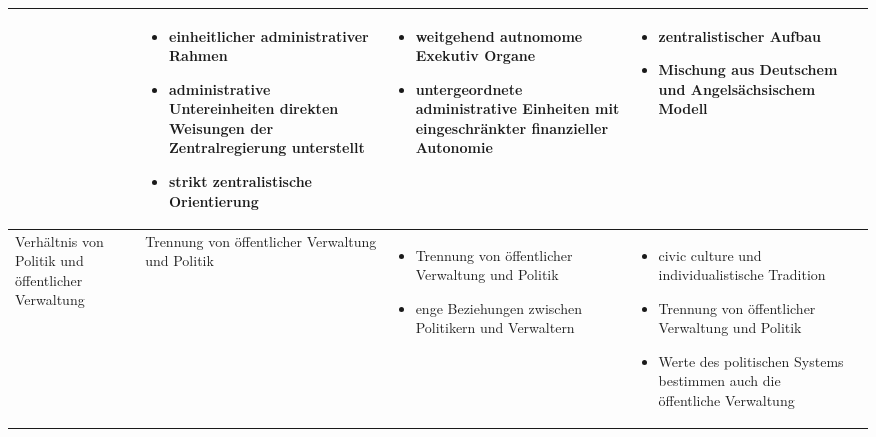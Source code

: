 \begin{landscape}
\begin{table}[!hbt]
\begin{tabular}{|L{4cm}|L{5cm}|L{5cm}|L{5cm}|L{5cm}|}
&
\begin{itemize}
\item einheitlicher administrativer Rahmen
\item administrative Untereinheiten direkten Weisungen der Zentralregierung unterstellt
\item strikt zentralistische Orientierung
\end{itemize}
&
\begin{itemize}
\item weitgehend autnomome Exekutiv Organe
\item untergeordnete administrative Einheiten mit eingeschränkter finanzieller Autonomie           
\end{itemize}
&
\begin{itemize}
\item zentralistischer Aufbau
\item Mischung aus Deutschem und Angelsächsischem Modell
\end{itemize}\\\hline
Verhältnis von Politik und öffentlicher Verwaltung&	Trennung von öffentlicher Verwaltung und Politik&
\begin{itemize}
\item Trennung von öffentlicher Verwaltung und Politik
\item enge Beziehungen zwischen Politikern und Verwaltern
\end{itemize}
&
 \vspace{-2mm}
\begin{itemize}
\item civic culture und individualistische Tradition
\item Trennung von öffentlicher Verwaltung und Politik
\item Werte des politischen Systems bestimmen auch die öffentliche Verwaltung
 \vspace{-2mm}
 \end{itemize}


\end{tabular}
\end{table}
\end{landscape}
